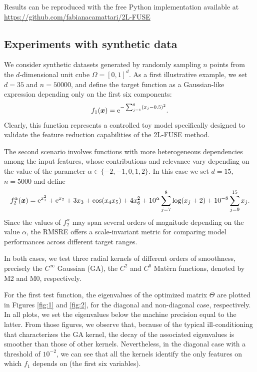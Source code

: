 \documentclass[hyphens,a4paper,11pt]{article}
\newcommand{\mTheta}{\mathsf{\Theta}}
\begin{document}
Results can be reproduced with the free Python implementation available at \url{https://github.com/fabianacamattari/2L-FUSE}

\subsection{Experiments with synthetic data}

We consider synthetic datasets generated by randomly sampling \(n\) points from the \(d\)-dimensional unit cube \(\Omega = [0,1]^d\). As a first illustrative example, we set \(d = 35\) and \(n = 50000\), and define the target function as a Gaussian-like expression depending only on the first six components:
$$ f_1(\boldsymbol{x}) = {\rm e}^{-\sum_{j=1}^6(x_j-0.5)^2}. $$
Clearly, this function represents a controlled toy model specifically designed to validate the feature reduction capabilities of the 2L-FUSE method.

The second scenario involves functions with more heterogeneous dependencies among the input features, whose contributions and relevance vary depending on the value of the parameter \(\alpha \in \{-2,-1,0,1,2\}\). In this case we set \(d=15\), \(n=5000\) and define
$$
f_{2}^\alpha(\boldsymbol{x}) = {\rm e}^{x_1^2} + {\rm e}^{x_2} + 3x_3 + \cos(x_4 x_5) + 4x_6^2 + 10^\alpha \sum_{j=7}^{8} \log(x_j + 2) + 10^{-8} \sum_{j=9}^{15} x_j .
$$
Since the values of $f_2^\alpha$ may span several orders of magnitude depending on the value $\alpha$, the RMSRE offers a scale-invariant metric for comparing model performances across different target ranges. 

In both cases, we test three radial kernels of different orders of smoothness, precisely the $C^{\infty}$ Gaussian (GA), the $C^2$ and $C^0$ Matèrn functions, denoted by M2 and M0, respectively.

For the first test function, the eigenvalues of the optimized matrix $\mTheta$ are plotted in Figures \ref{fig:1} and \ref{fig:2}, for the diagonal and non-diagonal case, respectively. In all plots, we set the eigenvalues below the machine precision equal to the latter. From those figures, we observe that, because of the typical ill-conditioning that characterizes the GA kernel, the decay of the associated eigenvalues is smoother than those of other kernels. Nevertheless, in the diagonal case with a threshold of  \(10^{-2}\), we can see that all the kernels identify the only features on which $f_1$ depends on (the first six variables).
\end{document}
